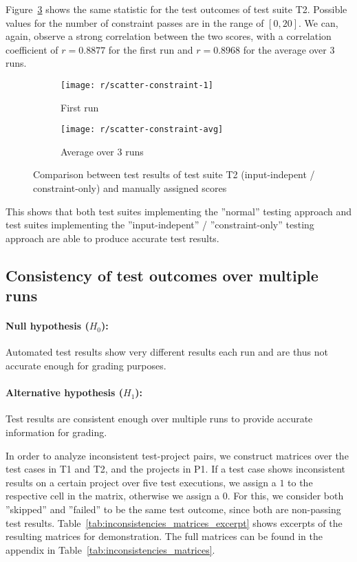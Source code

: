 Figure~\ref{fig:scatter_constraint} shows the same statistic for the test outcomes of test suite T2.
Possible values for the number of constraint passes are in the range of $[0, 20]$.
We can, again, observe a strong correlation between the two scores,
with a correlation coefficient of $r = 0.8877$ for the first run and $r = 0.8968$ for the average over 3 runs.

\begin{figure}[htpb]
    \centering
    \begin{subfigure}{.50\textwidth}
        \texttt{[image: r/scatter-constraint-1]}
        \caption{First run}
        \label{fig:scatter_constraint_1}
    \end{subfigure}%
    \begin{subfigure}{.50\textwidth}
        \texttt{[image: r/scatter-constraint-avg]}
        \caption{Average over 3 runs}
        \label{fig:scatter_constraint_avg}
    \end{subfigure}
    \caption{Comparison between test results of test suite T2 (input-indepent / constraint-only) and manually assigned scores}
    \label{fig:scatter_constraint}
\end{figure}

This shows that both test suites implementing the ''normal'' testing approach and
test suites implementing the ''input-indepent'' / ''constraint-only'' testing approach
are able to produce accurate test results.

\subsection{Consistency of test outcomes over multiple runs}

\paragraph{Null hypothesis ($H_0$):}
Automated test results show very different results each run and are thus not accurate enough for grading purposes.
\vspace{-\medskipamount}
\paragraph{Alternative hypothesis ($H_1$):}
Test results are consistent enough over multiple runs to provide accurate information for grading.
\parspace

In order to analyze inconsistent test-project pairs,
we construct matrices over the test cases in T1 and T2, and the projects in P1.
If a test case shows inconsistent results on a certain project over five test executions,
we assign a $1$ to the respective cell in the matrix, otherwise we assign a 0.
For this, we consider both ''skipped'' and ''failed'' to be the same test outcome, since both are non-passing test results.
Table~\ref{tab:inconsistencies_matrices_excerpt} shows excerpts of the resulting matrices for demonstration.
The full matrices can be found in the appendix in Table~\ref{tab:inconsistencies_matrices}.

